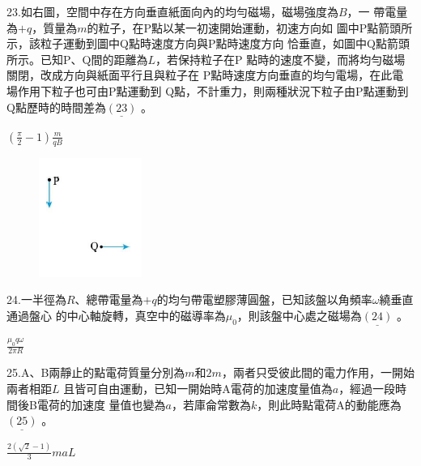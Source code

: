 \documentclass[cn,10pt,math=newtx,chinesefont=founder,device=ig]{elegantbook}
\begin{document}
\begin{example}
   23.如右圖，空間中存在方向垂直紙面向內的均勻磁場，磁場強度為$B$，一
帶電量為$+q$，質量為$m$的粒子，在P點以某一初速開始運動，初速方向如
圖中P點箭頭所示，該粒子運動到圖中Q點時速度方向與P點時速度方向
恰垂直，如圖中Q點箭頭所示。已知P、Q間的距離為$L$，若保持粒子在P
點時的速度不變，而將均勻磁場關閉，改成方向與紙面平行且與粒子在
P點時速度方向垂直的均勻電場，在此電場作用下粒子也可由P點運動到
Q點，不計重力，則兩種狀況下粒子由P點運動到Q點歷時的時間差為$\underline{(23)}$ 。\\
    \rightline{[文華高中教甄109]}
\end{example}
\begin{solution}
    $(\frac{\pi}{2}-1) \frac{m}{qB}$
\end{solution}
\begin{figure}[htbp]
    \flushright
    \includegraphics[width=0.3\textwidth]{image/109文華23.png}
  \end{figure}
\newpage


\begin{example}
   24.一半徑為$R$、總帶電量為$+q$的均勻帶電塑膠薄圓盤，已知該盤以角頻率$\omega$繞垂直通過盤心
的中心軸旋轉，真空中的磁導率為$\mu_0$，則該盤中心處之磁場為$\underline{(24)}$ 。\\
    \rightline{[文華高中教甄109]}
\end{example}
\begin{solution}
    $\frac{\mu_0 q \omega}{2\pi R}$
\end{solution}

\newpage


\begin{example}
   25.A、B兩靜止的點電荷質量分別為$m$和$2m$，兩者只受彼此間的電力作用，一開始兩者相距$L$
且皆可自由運動，已知一開始時A電荷的加速度量值為$a$，經過一段時間後B電荷的加速度
量值也變為$a$，若庫侖常數為$k$，則此時點電荷A的動能應為$\underline{(25)}$ 。\\
    \rightline{[文華高中教甄109]}
\end{example}
\begin{solution}
    $\frac{2(\sqrt{2}-1)}{3} maL$
\end{solution}
\end{document}
